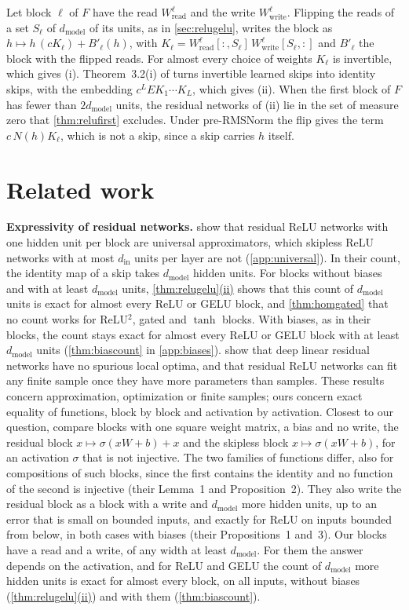 \documentclass[10pt]{article}
\theoremstyle{definition}
\theoremstyle{remark}
\newcommand{\Wread}{W_{\mathrm{read}}}
\newcommand{\Wwrite}{W_{\mathrm{write}}}
\newcommand{\dm}{d_{\mathrm{model}}}
\newcommand{\para}[1]{\smallskip\noindent\textbf{#1}\hspace{0.5em}}
\DeclareRobustCommand{\cpref}[2]{\hyperref[#1:#2]{\cref*{#1}(#2)}}
\begin{document}
Let block $\ell$ of $F$ have the read $\Wread^{\ell}$ and the write $\Wwrite^{\ell}$. Flipping the reads of a set $S_\ell$ of $\dm$ of its units, as in \cref{sec:relugelu}, writes the block as $h \mapsto h\,(cK_\ell) + B'_\ell(h)$, with $K_\ell = \Wread^{\ell}[{:},S_\ell]\,\Wwrite^{\ell}[S_\ell,{:}]$ and $B'_\ell$ the block with the flipped reads. For almost every choice of weights $K_\ell$ is invertible, which gives (i). Theorem~3.2(i) of \citet{karbevski2026unlock} turns invertible learned skips into identity skips, with the embedding $c^LEK_1\cdots K_L$, which gives (ii). When the first block of $F$ has fewer than $2\dm$ units, the residual networks of (ii) lie in the set of measure zero that \cref{thm:relufirst} excludes. Under pre-RMSNorm the flip gives the term $c\,N(h)K_\ell$, which is not a skip, since a skip carries $h$ itself.

\section{Related work}\label{sec:related}

\para{Expressivity of residual networks.} \citet{lin2018resnet} show that residual ReLU networks with one hidden unit per block are universal approximators, which skipless ReLU networks with at most $d_{\mathrm{in}}$ units per layer are not (\cref{app:universal}). In their count, the identity map of a skip takes $\dm$ hidden units. For blocks without biases and with at least $\dm$ units, \cpref{thm:relugelu}{ii} shows that this count of $\dm$ units is exact for almost every ReLU or GELU block, and \cref{thm:homgated} that no count works for ReLU$^2$, gated and $\tanh$ blocks. With biases, as in their blocks, the count stays exact for almost every ReLU or GELU block with at least $\dm$ units (\cref{thm:biascount} in \cref{app:biases}). \citet{hardt2017identity} show that deep linear residual networks have no spurious local optima, and that residual ReLU networks can fit any finite sample once they have more parameters than samples. These results concern approximation, optimization or finite samples; ours concern exact equality of functions, block by block and activation by activation. Closest to our question, \citet{mehmeti2025resnets} compare blocks with one square weight matrix, a bias and no write, the residual block $x \mapsto \sigma(xW + b) + x$ and the skipless block $x \mapsto \sigma(xW + b)$, for an activation $\sigma$ that is not injective. The two families of functions differ, also for compositions of such blocks, since the first contains the identity and no function of the second is injective (their Lemma~1 and Proposition~2). They also write the residual block as a block with a write and $\dm$ more hidden units, up to an error that is small on bounded inputs, and exactly for ReLU on inputs bounded from below, in both cases with biases (their Propositions~1 and~3). Our blocks have a read and a write, of any width at least $\dm$. For them the answer depends on the activation, and for ReLU and GELU the count of $\dm$ more hidden units is exact for almost every block, on all inputs, without biases (\cpref{thm:relugelu}{ii}) and with them (\cref{thm:biascount}).
\end{document}
